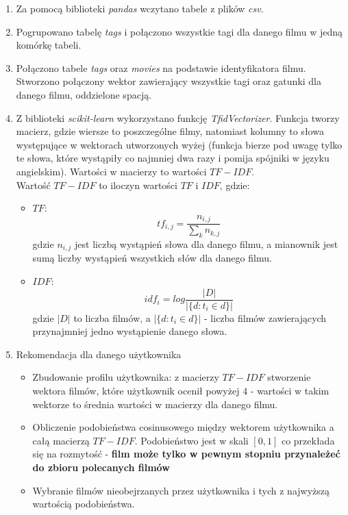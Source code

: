 \documentclass{article}
\begin{document}
\begin{enumerate}
    \item Za pomocą biblioteki \textit{pandas} wczytano tabele z plików \textit{csv}. 
    \item Pogrupowano tabelę \textit{tags} i połączono wszystkie tagi dla danego filmu w jedną komórkę tabeli.
    \item Połączono tabele \textit{tags} oraz \textit{movies} na podstawie identyfikatora filmu. Stworzono połączony wektor zawierający wszystkie tagi oraz gatunki dla danego filmu, oddzielone spacją.
    \item Z biblioteki \textit{scikit-learn} wykorzystano funkcję \textit{TfidVectorizer}. Funkcja tworzy macierz, gdzie wiersze to poszczególne filmy, natomiast kolumny to słowa występujące w wektorach utworzonych wyżej (funkcja bierze pod uwagę tylko te słowa, które wystąpiły co najmniej dwa razy i pomija spójniki w języku angielskim). Wartości w macierzy to wartości $TF-IDF$. \\ 
    Wartość $TF-IDF$ to iloczyn wartości $TF$ i $IDF$, gdzie:
    \begin{itemize}
        \item $TF$:
        \begin{equation}
            tf_{i,j} = \frac{n_{i, j}}{\sum_k n_{k, j}}
        \end{equation}
        gdzie $n_{i,j}$ jest liczbą wystąpień słowa dla danego filmu, a mianownik jest sumą liczby wystąpień wszystkich słów dla danego filmu.
        \item $IDF$:
        \begin{equation}
            idf_i = log \frac{|D|}{|\{d:t_i \in d\}|}
        \end{equation}
        gdzie $|D|$ to liczba filmów, a $|\{d:t_i \in d\}|$ - liczba filmów zawierających przynajmniej jedno wystąpienie danego słowa. 
    \end{itemize}
    \item Rekomendacja dla danego użytkownika
    \begin{itemize}
        \item Zbudowanie profilu użytkownika: z macierzy $TF-IDF$ stworzenie wektora filmów, które użytkownik ocenił powyżej $4$ - wartości w takim wektorze to średnia wartości w macierzy dla danego filmu.
        \item Obliczenie podobieństwa cosinusowego między wektorem użytkownika a całą macierzą $TF-IDF$. Podobieństwo jest w skali $[0,1]$ co przekłada się na rozmytość - \textbf{film może tylko w pewnym stopniu przynależeć do zbioru polecanych filmów}
        \item Wybranie filmów nieobejrzanych przez użytkownika i tych z najwyższą wartością podobieństwa.
    \end{itemize}
\end{enumerate}
\end{document}
